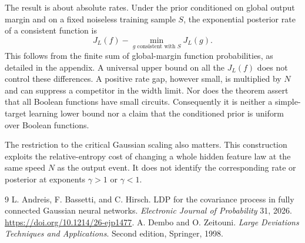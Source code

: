 \documentclass[11pt]{article}
\begin{document}
The result is about absolute rates. Under the prior conditioned on global
output margin and on a fixed noiseless training sample $S$, the exponential
posterior rate of a consistent function is
\[
 J_L(f)-\min_{g\text{ consistent with }S}J_L(g).
\]
This follows from the finite sum of global-margin function probabilities,
as detailed in the appendix. A universal upper bound on all the $J_L(f)$
does not control these differences. A positive rate gap, however small,
is multiplied by $N$ and can suppress a competitor in the width limit.
Nor does the theorem assert that all Boolean functions have small circuits.
Consequently it is neither a simple-target learning lower bound nor a
claim that the conditioned prior is uniform over Boolean functions.

The restriction to the critical Gaussian scaling also matters. This
construction exploits the relative-entropy cost of changing a whole
hidden feature law at the same speed $N$ as the output event. It does
not identify the corresponding rate or posterior at exponents
$\gamma>1$ or $\gamma<1$.

\appendix


\begin{thebibliography}{9}
 L. Andreis, F. Bassetti, and C. Hirsch.
LDP for the covariance process in fully connected Gaussian neural networks.
\emph{Electronic Journal of Probability} 31, 2026.
\url{https://doi.org/10.1214/26-ejp1477}.
 A. Dembo and O. Zeitouni.
\emph{Large Deviations Techniques and Applications}. Second edition,
Springer, 1998.
\end{thebibliography}
\end{document}
